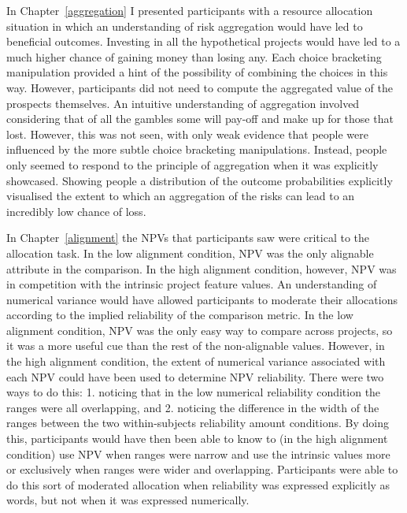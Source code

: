 \documentclass[a4paper, nobind, dvipsnames]{templates/ociamthesis}
\theoremstyle{definition}
\theoremstyle{definition}
\theoremstyle{definition}
\theoremstyle{definition}
\theoremstyle{remark}
\begin{document}
In Chapter~\ref{aggregation} I presented participants with a resource
allocation situation in which an understanding of risk aggregation would have
led to beneficial outcomes. Investing in all the hypothetical projects would
have led to a much higher chance of gaining money than losing any. Each choice
bracketing manipulation provided a hint of the possibility of combining the
choices in this way. However, participants did not need to compute the
aggregated value of the prospects themselves. An intuitive understanding of
aggregation involved considering that of all the gambles some will pay-off and
make up for those that lost. However, this was not seen, with only weak evidence
that people were influenced by the more subtle choice bracketing manipulations.
Instead, people only seemed to respond to the principle of aggregation when it
was explicitly showcased. Showing people a distribution of the outcome
probabilities explicitly visualised the extent to which an aggregation of the
risks can lead to an incredibly low chance of loss.

In Chapter~\ref{alignment} the NPVs that participants saw were critical to the
allocation task. In the low alignment condition, NPV was the only alignable
attribute in the comparison. In the high alignment condition, however, NPV was
in competition with the intrinsic project feature values. An understanding of
numerical variance would have allowed participants to moderate their allocations
according to the implied reliability of the comparison metric. In the low
alignment condition, NPV was the only easy way to compare across projects, so it
was a more useful cue than the rest of the non-alignable values. However, in the
high alignment condition, the extent of numerical variance associated with each
NPV could have been used to determine NPV reliability. There were two ways to do
this: 1. noticing that in the low numerical reliability condition the ranges
were all overlapping, and 2. noticing the difference in the width of the ranges
between the two within-subjects reliability amount conditions. By doing this,
participants would have then been able to know to (in the high alignment
condition) use NPV when ranges were narrow and use the intrinsic values more or
exclusively when ranges were wider and overlapping. Participants were able to do
this sort of moderated allocation when reliability was expressed explicitly as
words, but not when it was expressed numerically.
\end{document}
